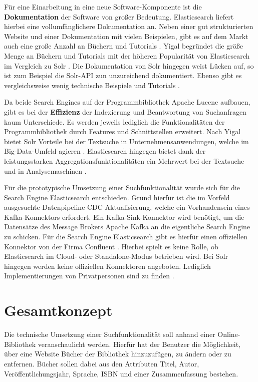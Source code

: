 Für eine Einarbeitung in eine neue Software-Komponente ist die \textbf{Dokumentation} der Software von großer Bedeutung. Elasticsearch liefert hierbei eine vollumfänglichere Dokumentation an. Neben einer gut strukturierten Website und einer Dokumentation mit vielen Beispielen, gibt es auf dem Markt auch eine große Anzahl an Büchern und Tutorials \cite{AsafYigal.2020}. Yigal begründet die größe Menge an Büchern und Tutorials mit der höheren Popularität von Elasticsearch im Vergleich zu Solr \cite{AsafYigal.2020}. Die Dokumentation von Solr hingegen weist Lücken auf, so ist zum Beispiel die Solr-API zun unzureichend dokumentiert. Ebenso gibt es vergleichsweise wenig technische Beispiele und Tutorials \cite{AsafYigal.2020}.

Da beide Search Engines auf der Programmbibliothek \glqq Apache Lucene\grqq{} aufbauen, gibt es bei der \textbf{Effizienz} der Indexierung und Beantwortung von Suchanfragen kaum Unterschiede. Es werden jeweils lediglich die Funktionalitäten der Programmbibliothek durch Features und Schnittstellen erweitert. Nach Yigal bietet Solr Vorteile bei der Textsuche in Unternehmensanwendungen, welche im Big-Data-Umfeld agieren \cite{AsafYigal.2020}. Elasticsearch hingegen bietet dank der leistungsstarken Aggregationsfunktionalitäten ein Mehrwert bei der Textsuche und in Analysemaschinen \cite{AsafYigal.2020}.

Für die prototypische Umsetzung einer Suchfunktionalität wurde sich für die Search Engine Elasticsearch entschieden. Grund hierfür ist die im Vorfeld ausgesuchte Datenpipeline \glqq CDC Aktualisierung\grqq{}, welche ein Vorhandensein eines Kafka-Konnektors erfordert. Ein Kafka-Sink-Konnektor wird benötigt, um die Datensätze des Message Brokers \glqq Apache Kafka\grqq{} an die eigentliche Search Engine zu schicken. Für die Search Engine Elasticsearch gibt es hierfür einen offiziellen Konnektor von der Firma Confluent \cite{Confluent.2021}. Hierbei spielt es keine Rolle, ob Elasticsearch im Cloud- oder Standalone-Modus betrieben wird. Bei Solr hingegen werden keine offiziellen Konnektoren angeboten. Lediglich Implementierungen von Privatpersonen sind zu finden \cite{bkatwal.2021}.

\section{Gesamtkonzept\label{sec4.3:Unterpunkt-3}}

Die technische Umsetzung einer Suchfunktionalität soll anhand einer Online-Bibliothek veranschaulicht werden. Hierfür hat der Benutzer die Möglichkeit, über eine Website Bücher der Bibliothek hinzuzufügen, zu ändern oder zu entfernen. Bücher sollen dabei aus den Attributen Titel, Autor, Veröffentlichungsjahr, Sprache, ISBN und einer Zusammenfassung bestehen.

